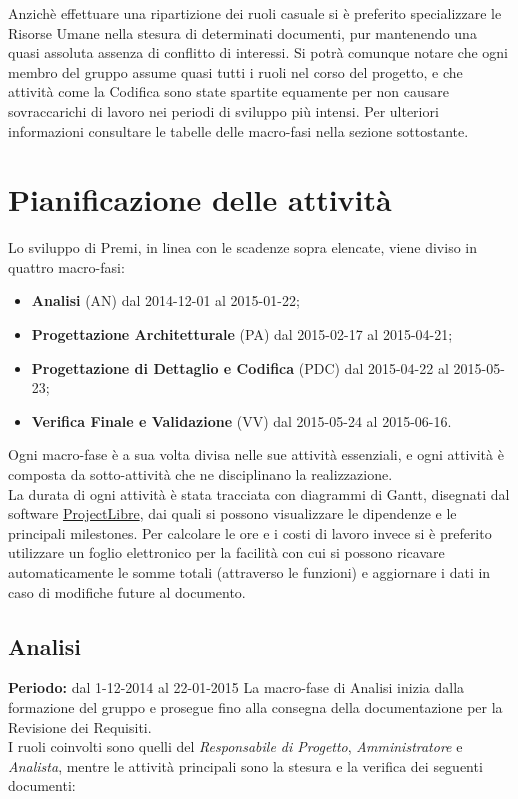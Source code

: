 Anzichè effettuare una ripartizione dei ruoli casuale si è preferito specializzare le Risorse Umane nella stesura di determinati documenti, pur mantenendo una quasi assoluta assenza di conflitto di interessi. Si potrà comunque notare che ogni membro del gruppo assume quasi tutti i ruoli nel corso del progetto, e che attività come la Codifica sono state spartite equamente per non causare sovraccarichi di lavoro nei periodi di sviluppo più intensi. Per ulteriori informazioni consultare le tabelle delle macro-fasi nella sezione sottostante.


\newpage
\section{Pianificazione delle attività}
Lo sviluppo di Premi, in linea con le scadenze sopra elencate, viene diviso in quattro macro-fasi:

\begin{itemize}
\item \textbf{Analisi} (AN) dal 2014-12-01 al 2015-01-22;
\item \textbf{Progettazione Architetturale} (PA) dal 2015-02-17 al 2015-04-21;
\item \textbf{Progettazione di Dettaglio e Codifica} (PDC) dal 2015-04-22 al 2015-05-23;
\item \textbf{Verifica Finale e Validazione} (VV) dal 2015-05-24 al 2015-06-16.
\end{itemize}

Ogni macro-fase è a sua volta divisa nelle sue attività essenziali, e ogni attività è composta da sotto-attività che ne disciplinano la realizzazione.\\
La durata di ogni attività è stata tracciata con diagrammi di Gantt, disegnati dal software \href{http://www.projectlibre.org/}{ProjectLibre}, dai quali si possono visualizzare le dipendenze e le principali milestones. Per calcolare le ore e i costi di lavoro invece si è preferito utilizzare un foglio elettronico per la facilità con cui si possono ricavare automaticamente le somme totali (attraverso le funzioni) e aggiornare i dati in caso di modifiche future al documento.

\newpage
\subsection{Analisi}
\textbf{Periodo:} dal 1-12-2014 al 22-01-2015
La macro-fase di Analisi inizia dalla formazione del gruppo e prosegue fino alla consegna della documentazione per la Revisione dei Requisiti. \\
I ruoli coinvolti sono quelli del \textit{Responsabile di Progetto}, \textit{Amministratore} e \textit{Analista}, mentre le attività principali sono la stesura e la verifica dei seguenti documenti:

